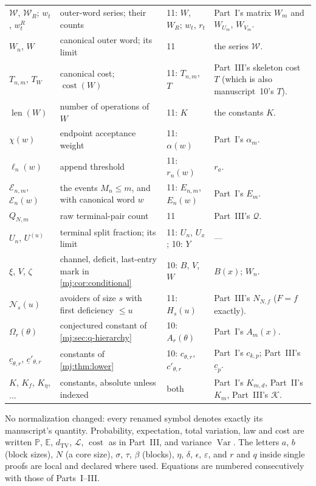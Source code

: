 \documentclass[11pt,a4paper]{article}
\theoremstyle{definition}\newaliascnt{definition}{theorem}
\theoremstyle{remark}\newaliascnt{remark}{theorem}
\newcommand{\ljP}{\mathbb P}
\newcommand{\ljE}{\mathbb E}
\newcommand{\ljTV}{d_{\mathrm{TV}}}
\newcommand{\ljLaw}{\mathcal L}
\newcommand{\ljcost}{\operatorname{cost}}
\newcommand{\ljQ}{\mathcal Q}
\newcommand{\ljK}{\mathcal K}
\newcommand{\mjVar}{\operatorname{Var}}
\newcommand{\mjlen}{\operatorname{len}}
\begin{document}
\begin{table}[htbp]
\begin{tabular}{>{\raggedright}p{.16\linewidth}>{\raggedright}p{.29\linewidth}>{\raggedright}p{.14\linewidth}>{\raggedright\arraybackslash}p{.29\linewidth}}
$\mathcal W$, $\mathcal W_R$; $w_t$, $w^R_t$ & outer-word series; their
 counts & 11: $W$, $W_R$; $w_t$, $r_t$ & Part~I's matrix $W_m$ and
 $W_{U_m}$, $W_{V_m}$.\\
$W_n$, $W$ & canonical outer word; its limit & 11 & the series
 $\mathcal W$.\\
$T_{n,m}$, $T_W$ & canonical cost; $\ljcost(W)$ & 11: $T_{n,m}$, $T$ &
 Part~III's skeleton cost $T$ (which is also manuscript~10's $T$).\\
$\mjlen(W)$ & number of operations of $W$ & 11: $K$ & the constants $K$.\\
$\chi(w)$ & endpoint acceptance weight & 11: $\alpha(w)$ & Part~I's
 $\alpha_m$.\\
$\ell_n(w)$ & append threshold & 11: $r_n(w)$ & $r_a$.\\
$\mathcal E_{n,m}$, $\mathcal E_n(w)$ & the events $M_n\le m$, and with
 canonical word $w$ & 11: $E_{n,m}$, $E_n(w)$ & Part~I's $E_m$.\\
$Q_{N,m}$ & raw terminal-pair count & 11 & Part~III's $\ljQ$.\\
$U_n$, $U^{(u)}$ & terminal split fraction; its limit & 11: $U_n$, $U_x$;
 10: $Y$ & ---\\
$\xi$, $V$, $\zeta$ & channel, deficit, last-entry mark in
 \cref{mj:cor:conditional} & 10: $B$, $V$, $W$ & $B(x)$; $W_n$.\\
$\mathcal N_s(u)$ & avoiders of size $s$ with first deficiency $\le u$ &
 11: $H_s(u)$ & Part~III's $N_{N,f}$ ($F=f$ exactly).\\
$\Omega_r(\theta)$ & conjectured constant of \cref{mj:sec:q-hierarchy} &
 10: $A_r(\theta)$ & Part~I's $A_m(x)$.\\
$\underline c_{\theta,r}$, $\underline c'_{\theta,r}$ & constants of
 \cref{mj:thm:lower} & 10: $c_{\theta,r}$, $c'_{\theta,r}$ & Part~I's
 $c_{k,p}$; Part~III's $\underline c_p$.\\
$K$, $K_f$, $K_\eta$, $\ldots$ & constants, absolute unless indexed & both &
 Part~I's $K_{m,d}$, Part~II's $K_m$, Part~III's $\ljK$.\\
\bottomrule
\end{tabular}
\end{table}

No normalization changed: every renamed symbol denotes exactly its
manuscript's quantity. Probability, expectation, total variation, law and
cost are written $\ljP$, $\ljE$, $\ljTV$, $\ljLaw$, $\ljcost$ as in
Part~III, and variance $\mjVar$. The letters $a$, $b$ (block sizes),
$N$ (a core size), $\sigma$, $\tau$, $\beta$ (blocks), $\eta$, $\delta$,
$\epsilon$, $\varepsilon$, and $r$ and $q$ inside single proofs are local and
declared where used. Equations are numbered consecutively with those of
Parts~I--III.
\end{document}
